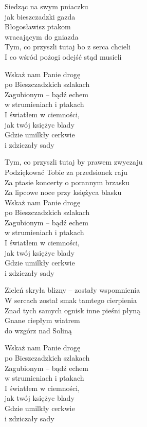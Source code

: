 \begin{text}
\hfill\break
\hfill\break
Siedząc na swym pniaczku\\
jak bieszczadzki gazda\\
Błogosławisz ptakom\\
wracającym do gniazda\\
Tym, co przyszli tutaj bo z serca chcieli\\
I co wśród pożogi odejść stąd musieli

\vin Wskaż nam Panie drogę\\
\vin po Bieszczadzkich szlakach\\
\vin Zagubionym – bądź echem\\
\vin w strumieniach i ptakach\\
\vin I światłem w ciemności,\\
\vin jak twój księżyc blady\\
\vin Gdzie umilkły cerkwie\\
\vin i zdziczały sady

Tym, co przyszli tutaj by prawem zwyczaju\\
Podziękować Tobie za przedsionek raju\\
Za ptasie koncerty o porannym brzasku\\
Za lipcowe noce przy księżyca blasku\\

Wskaż nam Panie drogę\\
po Bieszczadzkich szlakach\\
Zagubionym – bądź echem\\
w strumieniach i ptakach\\
I światłem w ciemności,\\
jak twój księżyc blady\\
Gdzie umilkły cerkwie\\
i zdziczały sady

\hfill\break
Zieleń skryła blizny – zostały wspomnienia\\
W sercach został smak tamtego cierpienia\\
Znad tych samych ognisk inne pieśni płyną\\
Gnane ciepłym wiatrem\\
do wzgórz nad Soliną

Wskaż nam Panie drogę\\
po Bieszczadzkich szlakach\\
Zagubionym – bądź echem\\
w strumieniach i ptakach\\
I światłem w ciemności,\\
jak twój księżyc blady\\
Gdzie umilkły cerkwie\\
i zdziczały sady
\end{text}
